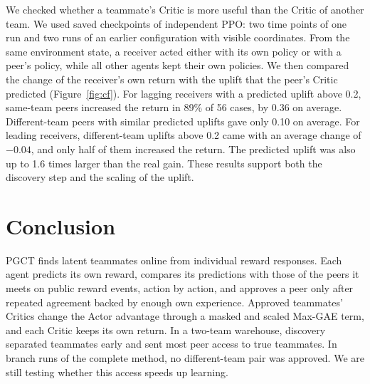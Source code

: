 \documentclass{article}
\begin{document}
We checked whether a teammate's Critic is more useful than the Critic of another team. We used saved checkpoints of independent PPO: two time points of one run and two runs of an earlier configuration with visible coordinates. From the same environment state, a receiver acted either with its own policy or with a peer's policy, while all other agents kept their own policies. We then compared the change of the receiver's own return with the uplift that the peer's Critic predicted (Figure~\ref{fig:cf}). For lagging receivers with a predicted uplift above 0.2, same-team peers increased the return in 89\% of 56 cases, by 0.36 on average. Different-team peers with similar predicted uplifts gave only 0.10 on average. For leading receivers, different-team uplifts above 0.2 came with an average change of $-0.04$, and only half of them increased the return. The predicted uplift was also up to 1.6 times larger than the real gain. These results support both the discovery step and the scaling of the uplift.

\section{Conclusion}
PGCT finds latent teammates online from individual reward responses. Each agent predicts its own reward, compares its predictions with those of the peers it meets on public reward events, action by action, and approves a peer only after repeated agreement backed by enough own experience. Approved teammates' Critics change the Actor advantage through a masked and scaled Max-GAE term, and each Critic keeps its own return. In a two-team warehouse, discovery separated teammates early and sent most peer access to true teammates. In branch runs of the complete method, no different-team pair was approved. We are still testing whether this access speeds up learning.



\end{document}
